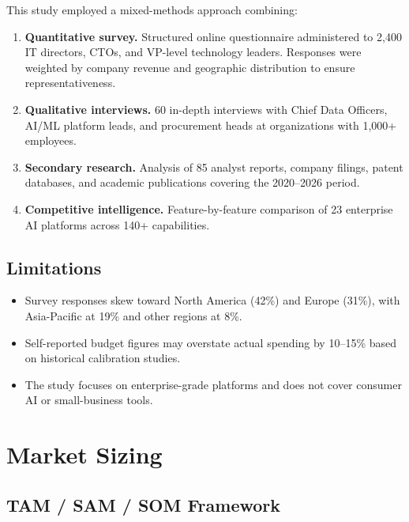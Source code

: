 \documentclass[
    language=english,
    doctype=market-analysis,
    institution=none,
]{../../omnilatex}
\begin{document}
This study employed a mixed-methods approach combining:

\begin{enumerate}
    \item \textbf{Quantitative survey.} Structured online questionnaire
        administered to 2,400 IT directors, CTOs, and VP-level technology
        leaders. Responses were weighted by company revenue and geographic
        distribution to ensure representativeness.
    \item \textbf{Qualitative interviews.} 60 in-depth interviews with
        Chief Data Officers, AI/ML platform leads, and procurement heads
        at organizations with 1,000+ employees.
    \item \textbf{Secondary research.} Analysis of 85 analyst reports,
        company filings, patent databases, and academic publications
        covering the 2020--2026 period.
    \item \textbf{Competitive intelligence.} Feature-by-feature comparison
        of 23 enterprise AI platforms across 140+ capabilities.
\end{enumerate}

\subsection{Limitations}

\begin{itemize}
    \item Survey responses skew toward North America (42\%) and Europe
          (31\%), with Asia-Pacific at 19\% and other regions at 8\%.
    \item Self-reported budget figures may overstate actual spending by
          10--15\% based on historical calibration studies.
    \item The study focuses on enterprise-grade platforms and does not
          cover consumer AI or small-business tools.
\end{itemize}

\section{Market Sizing}

\subsection{TAM / SAM / SOM Framework}
\end{document}
